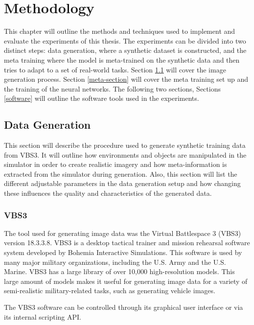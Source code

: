 \chapter{Methodology}
This chapter will outline the methods and techniques used to implement and evaluate the experiments of this thesis. The experiments can be divided into two distinct steps: data generation, where a synthetic dataset is constructed, and the meta training where the model is meta-trained on the synthetic data and then tries to adapt to a set of real-world tasks. Section \ref{image-gen} will cover the image generation process. Section \ref{meta-section} will cover the meta training set up and the training of the neural networks. The following two sections, Sections \ref{software} will outline the software tools used in the experiments.

\section{Data Generation}\label{image-gen}
This section will describe the procedure used to generate synthetic training data from \gls{VBS3}. It will outline how environments and objects are manipulated in the simulator in order to create realistic imagery and how meta-information is extracted from the simulator during generation. Also, this section will list the different adjustable parameters in the data generation setup and how changing these influences the quality and characteristics of the generated data.

\subsection{VBS3}
The tool used for generating image data was the Virtual Battlespace 3 (VBS3) version 18.3.3.8. \gls{VBS3} is a desktop tactical trainer and mission rehearsal software system developed by Bohemia Interactive Simulations. This software is used by many major military organizations, including the U.S. Army and the U.S. Marine. VBS3 has a large library of over 10,000 high-resolution models. This large amount of models makes it useful for generating image data for a variety of semi-realistic military-related tasks, such as generating vehicle images.

The VBS3 software can be controlled through its graphical user interface or via its internal scripting API. %



